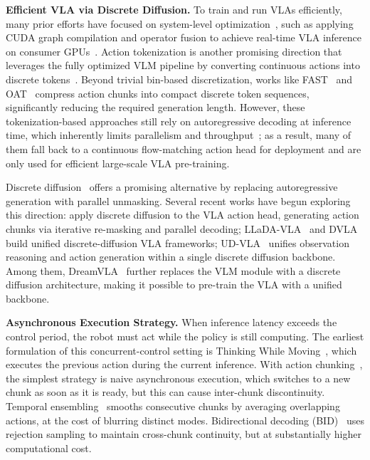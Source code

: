 \documentclass{article}
\begin{document}
\textbf{Efficient VLA via Discrete Diffusion.}
To train and run VLAs efficiently, many prior efforts have focused on system-level optimization~\citep{kim2024openvla}, such as applying CUDA graph compilation and operator fusion to achieve real-time VLA inference on consumer GPUs~\citep{ma2025running}.
Action tokenization is another promising direction that leverages the fully optimized VLM pipeline by converting continuous actions into discrete tokens~\citep{intelligence2025pi_}.
Beyond trivial bin-based discretization, works like FAST~\citep{pertsch2025fast} and OAT~\citep{liu2026oat} compress action chunks into compact discrete token sequences, significantly reducing the required generation length.
However, these tokenization-based approaches still rely on autoregressive decoding at inference time, which inherently limits parallelism and throughput~\citep{intelligence2025pi_}; as a result, many of them fall back to a continuous flow-matching action head for deployment and are only used for efficient large-scale VLA pre-training.

Discrete diffusion~\citep{lou2023discrete} offers a promising alternative by replacing autoregressive generation with parallel unmasking.
Several recent works have begun exploring this direction:
\citet{liang2025discrete} apply discrete diffusion to the VLA action head, generating action chunks via iterative re-masking and parallel decoding;
LLaDA-VLA~\citep{wen2025llada} and DVLA~\citep{wen2025dvla} build unified discrete-diffusion VLA frameworks;
UD-VLA~\citep{chen2025unified} unifies observation reasoning and action generation within a single discrete diffusion backbone.
Among them, DreamVLA~\citep{ye2025dream} further replaces the VLM module with a discrete diffusion architecture, making it possible to pre-train the VLA with a unified backbone.


\textbf{Asynchronous Execution Strategy.}
When inference latency exceeds the control period, the robot must act while the policy is still computing.
The earliest formulation of this concurrent-control setting is Thinking While Moving~\citep{xiao2020thinking}, which executes the previous action during the current inference.
With action chunking~\citep{lai2025action}, the simplest strategy is naive asynchronous execution, which switches to a new chunk as soon as it is ready, but this can cause inter-chunk discontinuity.
Temporal ensembling~\citep{zhao2023learning} smooths consecutive chunks by averaging overlapping actions, at the cost of blurring distinct modes.
Bidirectional decoding (BID)~\citep{liu2024bidirectional} uses rejection sampling to maintain cross-chunk continuity, but at substantially higher computational cost.
\end{document}
